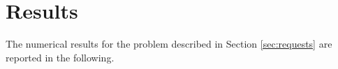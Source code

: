 \section{Results}
\label{sec:results}

The numerical results for the problem described in Section \ref{sec:requests} are reported in the following.